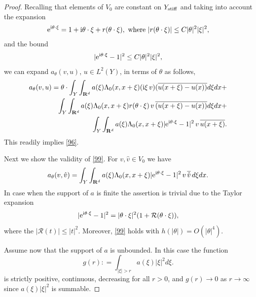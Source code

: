 \documentclass[11pt]{article}
\newcommand\stiff{{\rm stiff}}
\def\rme{{\rm e}}
\def\rmi{{\rm i}}
\newcommand{\R}{\mathbf{R}}
\theoremstyle{remark}
\begin{document}
\begin{proof}

Recalling that elements of $ V_0$ are constant on $Y_\stiff$ and taking into account the expansion
\begin{equation*}
	\rme^{\rmi \theta\cdot\xi} = 1 + \rmi \theta\cdot\xi + r(\theta\cdot \xi), \mbox{ where } |r(\theta\cdot \xi)| \leq C |\theta|^2 |\xi|^2,
\end{equation*}
and the bound
\begin{equation*}%
	|\rme^{\rmi \theta\cdot\xi} - 1|^2 \leq C |\theta|^2 |\xi|^2,
\end{equation*}
we can expand $a_\theta(v,u)$, $u\in {L^2(Y)}$, in terms of $\theta$ as follows,
\begin{equation*}
	\begin{aligned}
		a_\theta(v,u) = \theta \cdot \int_{Y}\int_{\R^d} a(\xi) \Lambda_0(x,x+\xi) ({\rmi \xi} \,v) (\overline{u(x+\xi)-u(x))}d\xi dx +
		\\
		\int_{Y}\int_{\R^d} a(\xi) \Lambda_0(x,x+\xi) r(\theta\cdot \xi) \,v\, \overline{(u(x+\xi)-u(x))}d\xi dx +
		\\
		\int_{Y}\int_{\R^d} a(\xi) \Lambda_0(x,x+\xi) |\rme^{\rmi \theta\cdot\xi} - 1|^2 \,v\,\overline{u(x+\xi)}.
	\end{aligned}
\end{equation*}
This readily implies  \eqref{96}.


Next we show the validity of \eqref{99}. For $v, \hat v \in V_0$ we have
\begin{equation*}%
	a_\theta(v, \hat v)  = \int_{Y}\int_{\R^d} a(\xi) \Lambda_0(x,x+\xi) |\rme^{\rmi \theta\cdot\xi} -1|^2 \,v\, \overline{\hat v}\,d\xi dx.
\end{equation*}	
In case when the support of $a$ is finite the assertion is trivial due to the Taylor expansion
\begin{equation}\label{101}
	|\rme^{\rmi \theta\cdot\xi} -1|^2 = |\theta\cdot \xi|^2(1 + \mathcal R(\theta\cdot \xi)),
\end{equation}
where the $|\mathcal R(t)| \leq |t|^2$. Moreover, \eqref{99} holds with  $h(|\theta|) = O(|\theta|^4)$.

Assume now that the support of $a$ is unbounded. In this case the function
\begin{equation}\label{183}
	g(r) : = 	 \int_{|\xi|>r} a(\xi) |\xi|^2 d\xi.
\end{equation}
is strictly positive, continuous, decreasing for all $r>0$, and $g(r)\to 0$ as $r \to \infty$ since $a(\xi)|\xi|^2$ is summable.


\end{proof}
\end{document}
